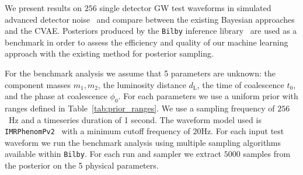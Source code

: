 \documentclass[%
showpacs,
 amsmath,amssymb,
 aps,
 twocolumn,
 prl,
 reprint,
floatfix,
]{revtex4-1}
\newcommand{\chris}[1]{\textbf{\textcolor{red}{CHRIS: #1}}}
\begin{document}
%
%

%
%
%
%
We present results on $256$ single detector \ac{GW} test waveforms in simulated advanced
detector noise~\cite{aligo_noisecurves} and compare between the existing
Bayesian approaches and the \ac{CVAE}. Posteriors produced by the
\texttt{Bilby} inference library~\cite{1811.02042} are used as a benchmark in
order to assess the efficiency and quality of our machine learning approach
with the existing method for posterior sampling.

%
%
For the benchmark analysis we assume that 5 parameters are unknown: the
component masses $m_1,m_2$, the luminosity distance $d_{\text{L}}$, the time of
coalescence $t_0$, and the phase at coalescence $\phi_0$. For each
parameters we use a uniform prior with ranges defined in
Table~\ref{tab:prior_ranges}.
We use a sampling frequency of $256$~Hz and a timeseries duration of 1 second.
The waveform model used is \texttt{IMRPhenomPv2}~\cite{1809.10113} with a
minimum cutoff frequency of $20$Hz. For each input test waveform we run the
benchmark analysis using multiple sampling algorithms available within
\texttt{Bilby}. For each run and sampler we extract $5000$ samples from the
posterior on the 5 physical parameters.  
\end{document}
